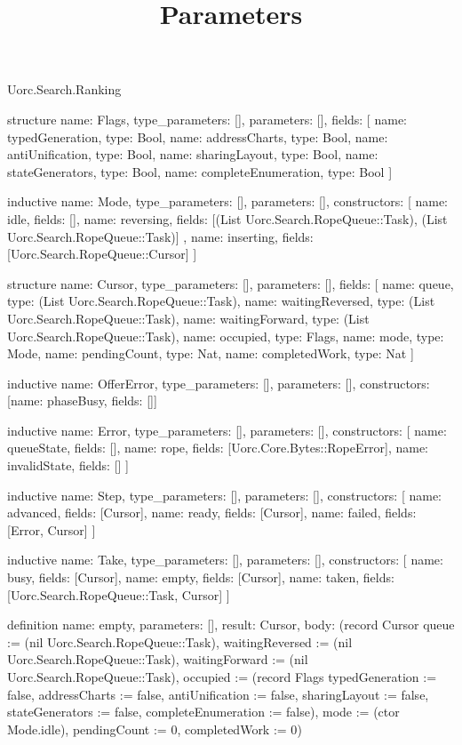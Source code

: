 \begin{lexlean}{Uorc.Search.Ranking}
\title{Parameters}
\begin{semanticmodule}
structure{
  name: Flags,
  type_parameters: [],
  parameters: [],
  fields: [
    {name: typedGeneration, type: Bool},
    {name: addressCharts, type: Bool},
    {name: antiUnification, type: Bool},
    {name: sharingLayout, type: Bool},
    {name: stateGenerators, type: Bool},
    {name: completeEnumeration, type: Bool}
  ]
}

inductive{
  name: Mode,
  type_parameters: [],
  parameters: [],
  constructors: [
    {name: idle, fields: []},
    {
      name: reversing,
      fields: [(List Uorc.Search.RopeQueue::Task), (List Uorc.Search.RopeQueue::Task)]
    },
    {name: inserting, fields: [Uorc.Search.RopeQueue::Cursor]}
  ]
}

structure{
  name: Cursor,
  type_parameters: [],
  parameters: [],
  fields: [
    {name: queue, type: (List Uorc.Search.RopeQueue::Task)},
    {name: waitingReversed, type: (List Uorc.Search.RopeQueue::Task)},
    {name: waitingForward, type: (List Uorc.Search.RopeQueue::Task)},
    {name: occupied, type: Flags},
    {name: mode, type: Mode},
    {name: pendingCount, type: Nat},
    {name: completedWork, type: Nat}
  ]
}

inductive{
  name: OfferError,
  type_parameters: [],
  parameters: [],
  constructors: [{name: phaseBusy, fields: []}]
}

inductive{
  name: Error,
  type_parameters: [],
  parameters: [],
  constructors: [
    {name: queueState, fields: []},
    {name: rope, fields: [Uorc.Core.Bytes::RopeError]},
    {name: invalidState, fields: []}
  ]
}

inductive{
  name: Step,
  type_parameters: [],
  parameters: [],
  constructors: [
    {name: advanced, fields: [Cursor]},
    {name: ready, fields: [Cursor]},
    {name: failed, fields: [Error, Cursor]}
  ]
}

inductive{
  name: Take,
  type_parameters: [],
  parameters: [],
  constructors: [
    {name: busy, fields: [Cursor]},
    {name: empty, fields: [Cursor]},
    {name: taken, fields: [Uorc.Search.RopeQueue::Task, Cursor]}
  ]
}

definition{
  name: empty,
  parameters: [],
  result: Cursor,
  body: (record Cursor {queue := (nil Uorc.Search.RopeQueue::Task), waitingReversed := (nil Uorc.Search.RopeQueue::Task), waitingForward := (nil Uorc.Search.RopeQueue::Task), occupied := (record Flags {typedGeneration := false, addressCharts := false, antiUnification := false, sharingLayout := false, stateGenerators := false, completeEnumeration := false}), mode := (ctor Mode.idle), pendingCount := 0, completedWork := 0})
}


\end{semanticmodule}
\end{lexlean}
